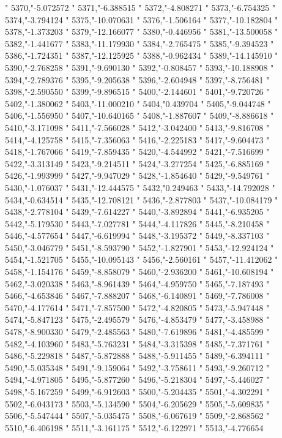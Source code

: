 "
5370,"-5.072572
"
5371,"-6.388515
"
5372,"-4.808271
"
5373,"-6.754325
"
5374,"-3.794124
"
5375,"-10.070631
"
5376,"-1.506164
"
5377,"-10.182804
"
5378,"-1.373203
"
5379,"-12.166077
"
5380,"-0.446956
"
5381,"-13.500058
"
5382,"-1.441677
"
5383,"-11.179930
"
5384,"-2.765475
"
5385,"-9.394523
"
5386,"-1.724351
"
5387,"-12.125925
"
5388,"-0.962434
"
5389,"-14.145910
"
5390,"-2.768258
"
5391,"-9.690130
"
5392,"-0.808457
"
5393,"-10.188908
"
5394,"-2.789376
"
5395,"-9.205638
"
5396,"-2.604948
"
5397,"-8.756481
"
5398,"-2.590550
"
5399,"-9.896515
"
5400,"-2.144601
"
5401,"-9.720726
"
5402,"-1.380062
"
5403,"-11.000210
"
5404,"0.439704
"
5405,"-9.044748
"
5406,"-1.556950
"
5407,"-10.640165
"
5408,"-1.887607
"
5409,"-8.886618
"
5410,"-3.171098
"
5411,"-7.566028
"
5412,"-3.042400
"
5413,"-9.816708
"
5414,"-4.125758
"
5415,"-7.356063
"
5416,"-2.225183
"
5417,"-9.604473
"
5418,"-1.767066
"
5419,"-7.859435
"
5420,"-4.544992
"
5421,"-7.516699
"
5422,"-3.313149
"
5423,"-9.214511
"
5424,"-3.277254
"
5425,"-6.885169
"
5426,"-1.993999
"
5427,"-9.947029
"
5428,"-1.854640
"
5429,"-9.549761
"
5430,"-1.076037
"
5431,"-12.444575
"
5432,"0.249463
"
5433,"-14.792028
"
5434,"-0.634514
"
5435,"-12.708121
"
5436,"-2.877803
"
5437,"-10.084179
"
5438,"-2.778104
"
5439,"-7.614227
"
5440,"-3.892894
"
5441,"-6.935205
"
5442,"-5.179530
"
5443,"-7.027781
"
5444,"-4.117826
"
5445,"-8.210458
"
5446,"-4.577654
"
5447,"-6.619994
"
5448,"-3.195372
"
5449,"-8.337103
"
5450,"-3.046779
"
5451,"-8.593790
"
5452,"-1.827901
"
5453,"-12.924124
"
5454,"-1.521705
"
5455,"-10.095143
"
5456,"-2.560161
"
5457,"-11.412062
"
5458,"-1.154176
"
5459,"-8.858079
"
5460,"-2.936200
"
5461,"-10.608194
"
5462,"-3.020338
"
5463,"-8.961439
"
5464,"-4.959750
"
5465,"-7.187493
"
5466,"-4.653846
"
5467,"-7.888207
"
5468,"-6.140891
"
5469,"-7.786008
"
5470,"-4.177614
"
5471,"-7.857500
"
5472,"-4.820805
"
5473,"-5.947448
"
5474,"-5.847123
"
5475,"-2.495579
"
5476,"-4.853479
"
5477,"-3.458988
"
5478,"-8.900330
"
5479,"-2.485563
"
5480,"-7.619896
"
5481,"-4.485599
"
5482,"-4.103960
"
5483,"-5.763231
"
5484,"-3.315398
"
5485,"-7.371761
"
5486,"-5.229818
"
5487,"-5.872888
"
5488,"-5.911455
"
5489,"-6.394111
"
5490,"-5.035348
"
5491,"-9.159064
"
5492,"-3.758611
"
5493,"-9.260712
"
5494,"-4.971805
"
5495,"-5.877260
"
5496,"-5.218304
"
5497,"-5.446027
"
5498,"-5.167259
"
5499,"-6.912603
"
5500,"-5.204435
"
5501,"-4.302291
"
5502,"-6.043173
"
5503,"-5.134590
"
5504,"-6.205629
"
5505,"-5.609835
"
5506,"-5.547444
"
5507,"-5.035475
"
5508,"-6.067619
"
5509,"-2.868562
"
5510,"-6.406198
"
5511,"-3.161175
"
5512,"-6.122971
"
5513,"-4.776654
